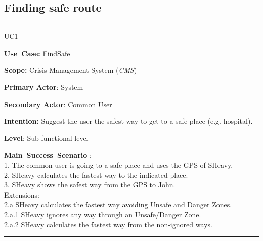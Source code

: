 \subsection{Finding safe route}
\vspace{0.5cm}
\hrule
\vspace{0.5cm}
\begin{lyxlist}{UC1}
\small{
\item [\textbf{Use~Case:}] FindSafe
\item [\textbf{Scope:}] Crisis Management System (\emph{CMS})
\item [\textbf{Primary Actor}:] System
\item [\textbf{Secondary Actor}:] Common User
\item [\textbf{Intention:}]Suggest the user the safest way to get to a safe
place (e.g. hospital).
\item [\textbf{Level}:]Sub-functional level
\item [\textbf{Main~Success~Scenario}]:\\
1. The common user is going to a safe place and uses the GPS of SHeavy.\\
2. SHeavy calculates the fastest way to the indicated place.\\
3. SHeavy shows the safest way from the GPS to John.\\
Extensions:\\
2.a SHeavy calculates the fastest way avoiding Unsafe and Danger Zones.\\
	2.a.1 SHeavy ignores any way through an Unsafe/Danger Zone.\\
	2.a.2 SHeavy calculates the fastest way from the non-ignored ways.\\
\item 
}
\end{lyxlist}
\hrule
\vspace{0.5cm}  
















